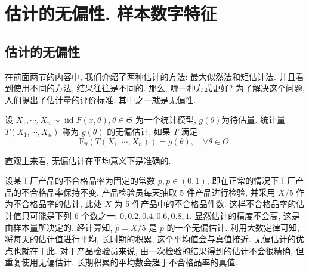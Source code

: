 \section{估计的无偏性. 样本数字特征}

\subsection{估计的无偏性}

在前面两节的内容中, 我们介绍了两种估计的方法: 最大似然法和矩估计法. 并且看到使用不同的方法, 结果往往是不同的. 那么, 哪一种方式更好? 为了解决这个问题, 人们提出了估计量的评价标准. 其中之一就是无偏性. 
\begin{definition}
    设 $X_1, \cdots, X_n \sim \operatorname{iid} F(x, \theta), \theta \in \Theta$ 为一个统计模型, $g(\theta)$为待估量. 统计量 $T\left(X_1, \cdots, X_n\right)$ 称为 $g(\theta)$ 的无偏估计, 如果 $T$ 满足
$$
\mathrm{E}_\theta\left(T\left(X_1, \cdots, X_n\right)\right)=g(\theta), \quad \forall \theta \in \Theta .
$$
\end{definition}

直观上来看, 无偏估计在平均意义下是准确的. 

\begin{example}
    设某工厂产品的不合格品率为固定的常数 $p, p \in(0,1)$, 即在正常的情况下工厂产品的不合格品率保持不变. 产品检验员每天抽取 5 件产品进行检验, 并采用 $X / 5$ 作为不合格品率的估计, 此处 $X$ 为 5 件产品中的不合格品件数. 这样不合格品率的估计值只可能是下列 6 个数之一: $0,0.2,0.4,0.6,0.8,1$. 显然估计的精度不会高, 这是由样本量所决定的. 经计算知, $\hat{p}=X / 5$ 是 $p$ 的一个无偏估计. 利用大数定律可知, 将每天的估计值进行平均, 长时期的积累, 这个平均值会与真值接近. 无偏估计的优点也就在于此. 对于产品检验员来说, 由一次检验的结果得到的估计不会很精确, 但重复使用无偏估计, 长期积累的平均数会趋于不合格品率的真值. 
\end{example}

